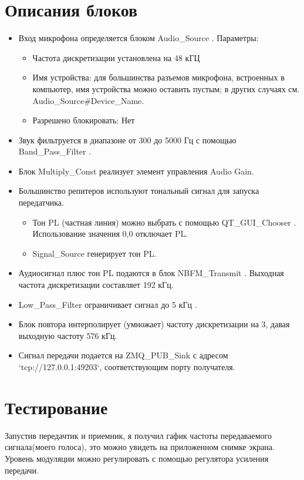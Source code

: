 \documentclass[12pt]{article}
\begin{document}
\section*{Описания блоков} 
\begin{flushleft}   


\begin{itemize}
    
        \item Вход микрофона определяется блоком Audio\_Source . Параметры:
        \begin{itemize}\item Частота дискретизации установлена на 48 кГЦ
        \item Имя устройства: для большинства разъемов микрофона, встроенных в компьютер, имя устройства можно оставить пустым; в других случаях см. Audio\_Source\#Device\_Name.
        \item Разрешено блокировать: Нет
\end{itemize}

    \item Звук фильтруется в диапазоне от 300 до 5000 Гц с помощью Band\_Pass\_Filter .
    \item Блок Multiply\_Const реализует элемент управления Audio Gain.
    \item Большинство репитеров используют тональный сигнал для запуска передатчика.
    \begin {itemize}
        \item Тон PL (частная линия) можно выбрать с помощью QT\_GUI\_Chooser . Использование значения 0,0 отключает PL.
        \item Signal\_Source генерирует тон PL.
    \end{itemize}
    \item Аудиосигнал плюс тон PL подаются в блок NBFM\_Transmit . Выходная частота дискретизации составляет 192 кГц.
    \item Low\_Pass\_Filter ограничивает сигнал до 5 кГц .
    \item Блок повтора интерполирует (умножает) частоту дискретизации на 3, давая выходную частоту 576 кГц.
    \item Сигнал передачи подается на ZMQ\_PUB\_Sink с адресом `tcp://127.0.0.1:49203`, соответствующим порту получателя. 
  \end{itemize}
\end{flushleft}
\section*{Тестирование} 
Запустив передачтик и приемник,  я получил гафик частоты передаваемого сигнала(моего голоса), это можно увидеть на приложенном снимке экрана. Уровень модуляции можно регулировать с помощью регулятора усиления передачи.
\end{document}
